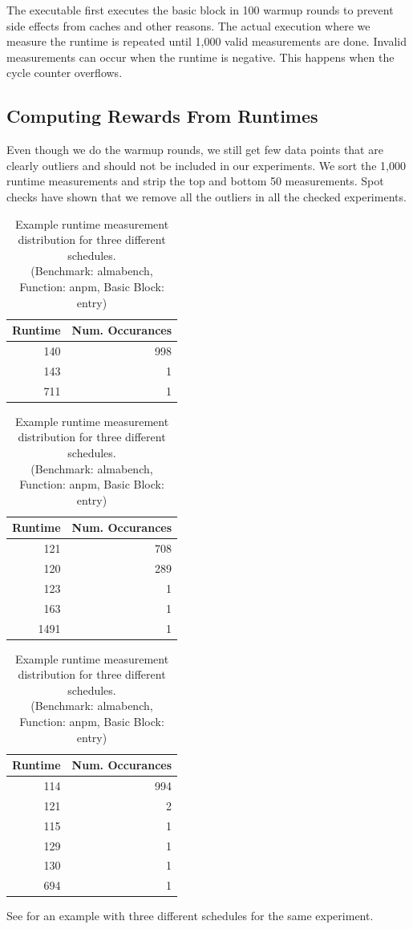 The executable first executes the basic block in 100 warmup rounds to prevent side effects from caches and other reasons.
The actual execution where we measure the runtime is repeated until 1,000 valid measurements are done.
Invalid measurements can occur when the runtime is negative.
This happens when the cycle counter overflows.

\subsection{Computing Rewards From Runtimes}
Even though we do the warmup rounds, we still get few data points that are clearly outliers and should not be included in our experiments.
We sort the 1,000 runtime measurements and strip the top and bottom 50 measurements.
Spot checks have shown that we remove all the outliers in all the checked experiments.
\begin{table}
    \centering
    \begin{tabular}{@{}rr@{}}
        \toprule
        Runtime & Num. Occurances \\
        \midrule
        140 & 998 \\
        143 & 1 \\
        711 & 1 \\
        \bottomrule
    \end{tabular}
    \hspace{0.8cm}
    \begin{tabular}{@{}rr@{}}
        \toprule
        Runtime & Num. Occurances \\
        \midrule
        121 & 708 \\
        120 & 289 \\
        123 & 1 \\
        163 & 1 \\
        1491 & 1 \\
        \bottomrule
    \end{tabular}
    \hspace{0.8cm}
    \begin{tabular}{@{}rr@{}}
        \toprule
        Runtime & Num. Occurances \\
        \midrule
        114 & 994 \\
        121 & 2 \\
        115 & 1 \\
        129 & 1 \\
        130 & 1 \\
        694 & 1 \\
        \bottomrule
    \end{tabular}
    \caption[Example Runtime Measurement Distribution]{Example runtime measurement distribution for three different schedules.\\(Benchmark: almabench, Function: anpm, Basic Block: entry)}
    \label{tab:approach:example_runtimes}
\end{table}
See  for an example with three different schedules for the same experiment.


